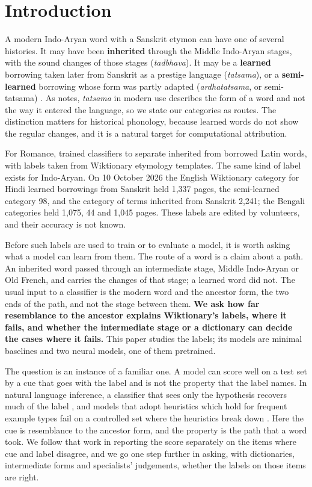 \documentclass[11pt]{article}
\begin{document}
\section{Introduction}

A modern Indo-Aryan word with a Sanskrit etymon can have one of several histories. It may have been \textbf{inherited} through the Middle Indo-Aryan stages, with the sound changes of those stages (\textit{tadbhava}). It may be a \textbf{learned} borrowing taken later from Sanskrit as a prestige language (\textit{tatsama}), or a \textbf{semi-learned} borrowing whose form was partly adapted (\textit{ardhatatsama}, or semi-tatsama) \citep[\S111]{chatterji1926}. As \citeauthor{chatterji1926} notes, \textit{tatsama} in modern use describes the form of a word and not the way it entered the language, so we state our categories as routes. The distinction matters for historical phonology, because learned words do not show the regular changes, and it is a natural target for computational attribution.

For Romance, \citet{cristea2021inherited} trained classifiers to separate inherited from borrowed Latin words, with labels taken from Wiktionary etymology templates. The same kind of label exists for Indo-Aryan. On 10 October 2026 the English Wiktionary category for Hindi learned borrowings from Sanskrit held 1,337 pages, the semi-learned category 98, and the category of terms inherited from Sanskrit 2,241; the Bengali categories held 1,075, 44 and 1,045 pages. These labels are edited by volunteers, and their accuracy is not known.

Before such labels are used to train or to evaluate a model, it is worth asking what a model can learn from them. The route of a word is a claim about a path. An inherited word passed through an intermediate stage, Middle Indo-Aryan or Old French, and carries the changes of that stage; a learned word did not. The usual input to a classifier is the modern word and the ancestor form, the two ends of the path, and not the stage between them. \textbf{We ask how far resemblance to the ancestor explains Wiktionary's labels, where it fails, and whether the intermediate stage or a dictionary can decide the cases where it fails.} This paper studies the labels; its models are minimal baselines and two neural models, one of them pretrained.

The question is an instance of a familiar one. A model can score well on a test set by a cue that goes with the label and is not the property that the label names. In natural language inference, a classifier that sees only the hypothesis recovers much of the label \citep{gururangan2018annotation}, and models that adopt heuristics which hold for frequent example types fail on a controlled set where the heuristics break down \citep{mccoy2019right}. Here the cue is resemblance to the ancestor form, and the property is the path that a word took. We follow that work in reporting the score separately on the items where cue and label disagree, and we go one step further in asking, with dictionaries, intermediate forms and specialists' judgements, whether the labels on those items are right.
\end{document}
